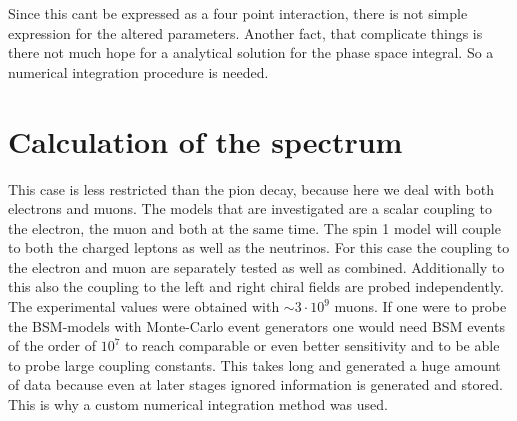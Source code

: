 Since this cant be expressed as a four point interaction, there is not simple expression for the altered parameters. Another fact, that complicate things is there not much hope for a analytical solution for the phase space integral. So a numerical integration procedure is needed. 
\section{Calculation of the spectrum}
This case is less restricted than the pion decay, because here we deal with both electrons and muons.
The models that are investigated are a scalar coupling to the electron, the muon and both at the same time. The spin 1 model will couple to both the charged leptons as well as the neutrinos. For this case the coupling to the electron and muon are separately tested as well as combined. Additionally to this also the coupling to the left and right chiral fields are probed independently. 
The experimental values were obtained with $\sim 3\cdot 10^{9}$ muons. If one were to probe the BSM-models with Monte-Carlo event generators one would need BSM events of the order of $10^7$ to reach comparable or even better sensitivity and to be able to probe large coupling constants.
This takes long and generated a huge amount of data because even at later stages ignored information is generated and stored. 
This is why a custom numerical integration method was used. 

